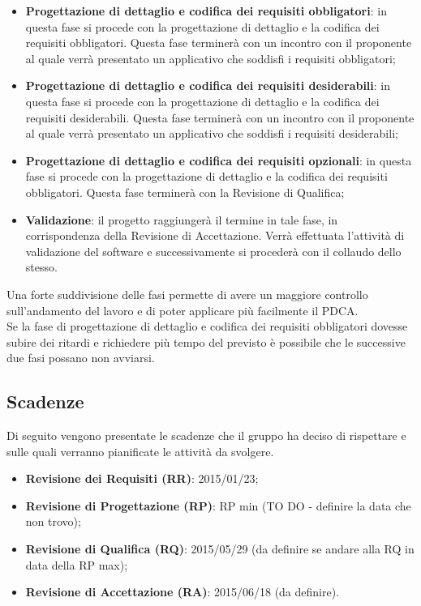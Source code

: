 \begin{itemize}
			\item \textbf{Progettazione di dettaglio e codifica dei requisiti obbligatori}: in questa fase si procede con la progettazione di dettaglio e la codifica dei requisiti obbligatori. Questa fase terminerà con un incontro con il proponente al quale verrà presentato un applicativo che soddisfi i requisiti obbligatori;
			
			\item \textbf{Progettazione di dettaglio e codifica dei requisiti desiderabili}: in questa fase si procede con la progettazione di dettaglio e la codifica dei requisiti desiderabili. Questa fase terminerà con un incontro con il proponente al quale verrà presentato un applicativo che soddisfi i requisiti desiderabili;
			
			\item \textbf{Progettazione di dettaglio e codifica dei requisiti opzionali}: in questa fase si procede con la progettazione di dettaglio e la codifica dei requisiti obbligatori. Questa fase terminerà con la Revisione di Qualifica;
			
			\item \textbf{Validazione}: il progetto raggiungerà il termine in tale fase, in corrispondenza della Revisione di Accettazione. Verrà effettuata l’attività di validazione del software e successivamente si procederà con il collaudo dello stesso.
		\end{itemize}
\noindent
Una forte suddivisione delle fasi permette di avere un maggiore controllo sull'andamento del lavoro e di poter applicare più facilmente il PDCA. \\
Se la fase di progettazione di dettaglio e codifica dei requisiti obbligatori dovesse subire dei ritardi e richiedere più tempo del previsto è possibile che le successive due fasi possano non avviarsi.

	\subsection{Scadenze}
Di seguito vengono presentate le scadenze che il gruppo \groupName{} ha deciso di rispettare e sulle quali verranno pianificate le attività da svolgere.
		\begin{itemize}
			\item \textbf{Revisione dei Requisiti (RR)}: 2015/01/23;
			\item \textbf{Revisione di Progettazione (RP)}: RP min (TO DO - definire la data che non trovo);
			\item \textbf{Revisione di Qualifica (RQ)}: 2015/05/29 (da definire se andare alla RQ in data della RP max);
			\item \textbf{Revisione di Accettazione (RA)}: 2015/06/18 (da definire).
		\end{itemize}